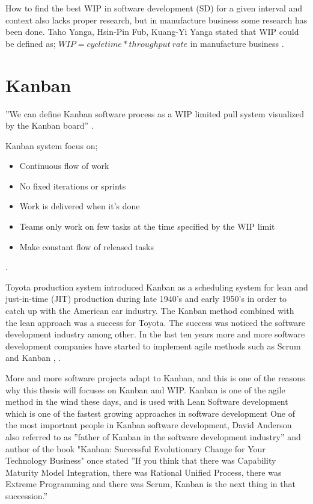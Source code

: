 \documentclass[UKenglish]{ifimaster}  %
\begin{document}
How to find the best WIP in software development (SD) for a given interval and context also lacks proper research, but in manufacture business some research has been done. Taho Yanga, Hsin-Pin Fub, Kuang-Yi Yanga stated that WIP could be defined as; ${WIP = cycle time * throughput \: rate}$ in manufacture business \parencite{Yang}.

\section{Kanban}
''We can define Kanban software process as a WIP limited pull system visualized by the Kanban board''  \parencite{DavidAnderson}.

Kanban system focus on;
\begin{itemize}
\item Continuous flow of work
\item	No fixed iterations or sprints
\item Work is delivered when it's done
\item Teams only work on few tasks at the time specified by the WIP limit
\item Make constant flow of released tasks
\end{itemize}
\parencite{DavidAnderson}.

Toyota production system introduced Kanban as a scheduling system for lean and just-in-time (JIT) production during late 1940's and early 1950's in order to catch up with the American car industry. The Kanban method combined with the lean approach was a success for Toyota. The success was noticed the software development industry among other. In the last ten years more and more software development companies have started to implement agile methods such as Scrum and Kanban \parencite{Conboy}, \parencite{ono1988toyota}. 

More and more software projects adapt to Kanban, and this is one of the reasons why this thesis will focuses on Kanban and WIP.
Kanban is one of the agile method in the wind these days, and is used with Lean Software development which is one of the fastest growing approaches in software development \parencite{DavidAnderson}
One of the most important people in Kanban software development, David Anderson  also referred to as ''father of Kanban in the software development industry''  \parencite{InfoQ:2013:May:Online} and author of the book "Kanban: Successful Evolutionary Change for Your Technology Business" once stated ''If you think that there was Capability Maturity Model Integration, there was Rational Unified Process, there was Extreme Programming and there was Scrum, Kanban is the next thing in that succession.''   \parencite{InfoQ} 
\end{document}
